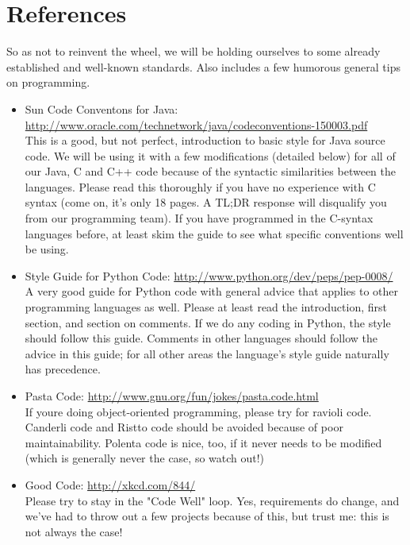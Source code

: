 \documentclass[12pt]{article}
\begin{document}
\section{References}
\label{sec:references}
So as not to reinvent the wheel, we will be holding ourselves to some already established and well-known standards. Also includes a few humorous general tips on programming.
\begin{itemize}
    \item Sun Code Conventons for Java: \url{http://www.oracle.com/technetwork/java/codeconventions-150003.pdf} \\
        This is a good, but not perfect, introduction to basic style for Java source code. We will be using it with a few modifications (detailed below) for all of our Java, C and C++ code because of the syntactic similarities between the languages. Please read this thoroughly if you have no experience with C syntax (come on, it's only 18 pages. A TL;DR response will disqualify you from our programming team). If you have programmed in the C-syntax languages before, at least skim the guide to see what specific conventions well be using.
    \item \label{pyguide} Style Guide for Python Code: \url{http://www.python.org/dev/peps/pep-0008/} \\
        A very good guide for Python code with general advice that applies to other programming languages as well. Please at least read the introduction, first section, and section on comments. If we do any coding in Python, the style should follow this guide. Comments in other languages should follow the advice in this guide; for all other areas the language's style guide naturally has precedence.
    \item Pasta Code: \url{http://www.gnu.org/fun/jokes/pasta.code.html} \\
        If youre doing object-oriented programming, please try for ravioli code. Canderli code and Ristto code should be avoided because of poor maintainability. Polenta code is nice, too, if it never needs to be modified (which is generally never the case, so watch out!)
    \item Good Code: \url{http://xkcd.com/844/} \\
        Please try to stay in the "Code Well" loop. Yes, requirements do change, and we've had to throw out a few projects because of this, but trust me: this is not always the case!
\end{itemize}
\end{document}
